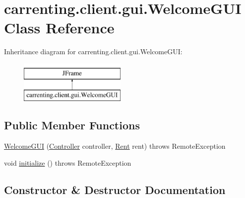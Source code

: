 \hypertarget{classcarrenting_1_1client_1_1gui_1_1_welcome_g_u_i}{}\section{carrenting.\+client.\+gui.\+Welcome\+G\+UI Class Reference}
\label{classcarrenting_1_1client_1_1gui_1_1_welcome_g_u_i}
Inheritance diagram for carrenting.\+client.\+gui.\+Welcome\+G\+UI\+:\begin{figure}[H]
\begin{center}
\leavevmode
\includegraphics[height=2.000000cm]{classcarrenting_1_1client_1_1gui_1_1_welcome_g_u_i}
\end{center}
\end{figure}
\subsection*{Public Member Functions}
\begin{DoxyCompactItemize}
\item 
\mbox{\hyperlink{classcarrenting_1_1client_1_1gui_1_1_welcome_g_u_i_aa0e1b87864f44f0af40335a5ebc12a8c}{Welcome\+G\+UI}} (\mbox{\hyperlink{classcarrenting_1_1client_1_1_controller}{Controller}} controller, \mbox{\hyperlink{classcarrenting_1_1server_1_1jdo_1_1_rent}{Rent}} rent)  throws Remote\+Exception
\item 
void \mbox{\hyperlink{classcarrenting_1_1client_1_1gui_1_1_welcome_g_u_i_a2bfdeb076ee5dec04b540de7b4e36a9f}{initialize}} ()  throws Remote\+Exception 
\end{DoxyCompactItemize}


\subsection{Constructor \& Destructor Documentation}
\mbox{\label{classcarrenting_1_1client_1_1gui_1_1_welcome_g_u_i_aa0e1b87864f44f0af40335a5ebc12a8c}} 
